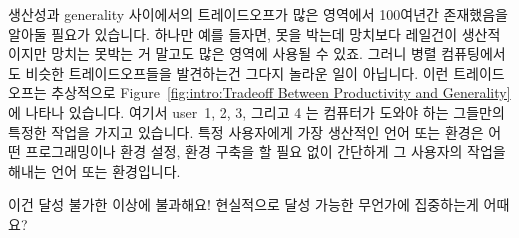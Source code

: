 생산성과 generality 사이에서의 트레이드오프가 많은 영역에서 100여년간
존재했음을 알아둘 필요가 있습니다.
하나만 예를 들자면, 못을 박는데 망치보다 레일건이 생산적이지만 망치는 못박는 거
말고도 많은 영역에 사용될 수 있죠.
그러니 병렬 컴퓨팅에서도 비슷한 트레이드오프들을 발견하는건 그다지 놀라운 일이
아닙니다.
이런 트레이드오프는 추상적으로 Figure~\ref{fig:intro:Tradeoff Between
Productivity and Generality} 에 나타나 있습니다.
여기서 user~1, 2, 3, 그리고 4 는 컴퓨터가 도와야 하는 그들만의 특정한 작업을
가지고 있습니다.
특정 사용자에게 가장 생산적인 언어 또는 환경은 어떤 프로그래밍이나 환경 설정,
환경 구축을 할 필요 없이 간단하게 그 사용자의 작업을 해내는 언어 또는
환경입니다.


\QuickQuiz{}
	이건 달성 불가한 이상에 불과해요!
	현실적으로 달성 가능한 무언가에 집중하는게 어때요?

 \QuickQuizEnd

